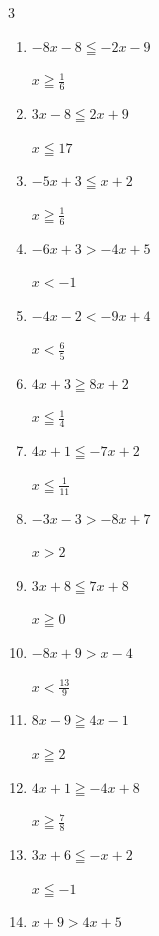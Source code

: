 \begin{multicols}{3}
\begin{enumerate}
        $\displaystyle x>\frac{3}{4}$

  \item $-8x-8\leqq -2x-9$

        $\displaystyle x\geqq \frac{1}{6}$

  \item $3x-8\leqq 2x+9$

        $\displaystyle x\leqq 17$

  \item $-5x+3\leqq x+2$

        $\displaystyle x\geqq \frac{1}{6}$

  \item $-6x+3>-4x+5$

        $\displaystyle x<-1$

  \item $-4x-2<-9x+4$

        $\displaystyle x<\frac{6}{5}$

  \item $4x+3\geqq 8x+2$

        $\displaystyle x\leqq \frac{1}{4}$

  \item $4x+1\leqq -7x+2$

        $\displaystyle x\leqq \frac{1}{11}$

  \item $-3x-3>-8x+7$

        $\displaystyle x>2$

  \item $3x+8\leqq 7x+8$

        $\displaystyle x\geqq 0$

  \item $-8x+9>x-4$

        $\displaystyle x<\frac{13}{9}$

  \item $8x-9\geqq 4x-1$

        $\displaystyle x\geqq 2$

\columnbreak %

\resetques

  \item $4x+1\geqq -4x+8$

        $\displaystyle x\geqq \frac{7}{8}$

  \item $3x+6\leqq -x+2$

        $\displaystyle x\leqq -1$

  \item $x+9>4x+5$


\end{enumerate}
\end{multicols}
